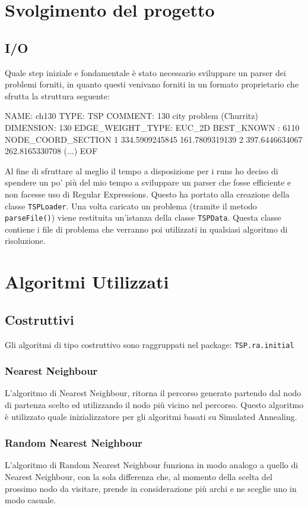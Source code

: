 \documentclass{article}
\newcommand{\ic}[1]{\texttt{#1}}
\begin{document}
\pagebreak
\section{Svolgimento del progetto}
\subsection{I/O}
Quale step iniziale e fondamentale è stato necessario sviluppare un parser dei problemi
forniti, in quanto questi venivano forniti in un formato proprietario che sfrutta la
struttura seguente:

\begin{tsp}
NAME: ch130
TYPE: TSP
COMMENT: 130 city problem (Churritz)
DIMENSION: 130
EDGE_WEIGHT_TYPE: EUC_2D
BEST_KNOWN : 6110
NODE_COORD_SECTION
1 334.5909245845 161.7809319139
2 397.6446634067 262.8165330708
(...)
EOF
\end{tsp}

Al fine di sfruttare al meglio il tempo a disposizione per i runs ho deciso di spendere
un po' più del mio tempo a sviluppare un parser che fosse efficiente e non facesse
uso di Regular Expressions. Questo ha portato alla creazione della classe \ic{TSPLoader}.
Una volta caricato un problema (tramite il metodo \ic{parseFile()}) viene restituita
un'istanza della classe \ic{TSPData}. Questa classe contiene i file di problema che
verranno poi utilizzati in qualsiasi algoritmo di risoluzione.

\section{Algoritmi Utilizzati}

\subsection{Costruttivi}
Gli algoritmi di tipo costruttivo sono raggruppati nel package: \texttt{TSP.ra.initial}

\subsubsection{Nearest Neighbour}
L'algoritmo di Nearest Neighbour,
ritorna il percorso generato partendo dal nodo di partenza scelto ed utilizzando
il nodo più vicino nel percorso. Questo algoritmo è utilizzato quale inizializzatore
per gli algoritmi basati su Simulated Annealing.

\subsubsection{Random Nearest Neighbour}
L'algoritmo di Random Nearest Neighbour funziona in modo analogo a quello di Nearest
Neighbour, con la sola differenza che, al momento della scelta del prossimo nodo da
visitare, prende in considerazione più archi e ne sceglie uno in modo casuale.
\end{document}
